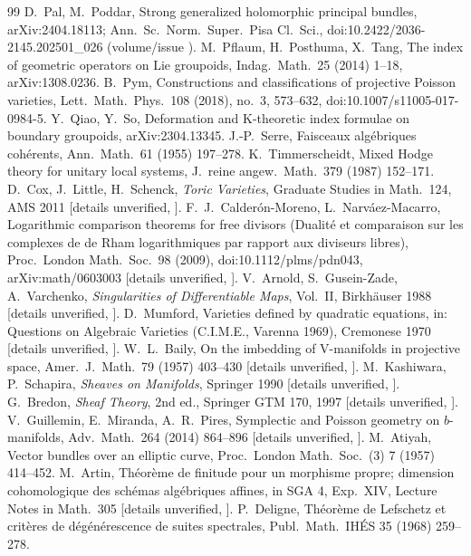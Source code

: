 \begin{thebibliography}{99}
 D.\ Pal, M.\ Poddar, Strong generalized holomorphic principal bundles, arXiv:2404.18113; Ann.\ Sc.\ Norm.\ Super.\ Pisa Cl.\ Sci., doi:10.2422/2036-2145.202501\_026 (volume/issue \tQ).
 M.\ Pflaum, H.\ Posthuma, X.\ Tang, The index of geometric operators on Lie groupoids, Indag.\ Math.\ 25 (2014) 1--18, arXiv:1308.0236.
 B.\ Pym, Constructions and classifications of projective Poisson varieties, Lett.\ Math.\ Phys.\ 108 (2018), no.\ 3, 573--632, doi:10.1007/s11005-017-0984-5.
 Y.\ Qiao, Y.\ So, Deformation and K-theoretic index formulae on boundary groupoids, arXiv:2304.13345.
 J.-P.\ Serre, Faisceaux alg\'ebriques coh\'erents, Ann.\ Math.\ 61 (1955) 197--278.
 K.\ Timmerscheidt, Mixed Hodge theory for unitary local systems, J.\ reine angew.\ Math.\ 379 (1987) 152--171.
 D.\ Cox, J.\ Little, H.\ Schenck, \emph{Toric Varieties}, Graduate Studies in Math.\ 124, AMS 2011 [details unverified, \tQ].
 F.\ J.\ Calder\'on-Moreno, L.\ Narv\'aez-Macarro, Logarithmic comparison theorems for free divisors (Dualit\'e et comparaison sur les complexes de de Rham logarithmiques par rapport aux diviseurs libres), Proc.\ London Math.\ Soc.\ 98 (2009), doi:10.1112/plms/pdn043, arXiv:math/0603003 [details unverified, \tQ].
 V.\ Arnold, S.\ Gusein-Zade, A.\ Varchenko, \emph{Singularities of Differentiable Maps}, Vol.\ II, Birkh\"auser 1988 [details unverified, \tQ].
 D.\ Mumford, Varieties defined by quadratic equations, in: Questions on Algebraic Varieties (C.I.M.E., Varenna 1969), Cremonese 1970 [details unverified, \tQ].
 W.\ L.\ Baily, On the imbedding of V-manifolds in projective space, Amer.\ J.\ Math.\ 79 (1957) 403--430 [details unverified, \tQ].
 M.\ Kashiwara, P.\ Schapira, \emph{Sheaves on Manifolds}, Springer 1990 [details unverified, \tQ].
 G.\ Bredon, \emph{Sheaf Theory}, 2nd ed., Springer GTM 170, 1997 [details unverified, \tQ].
 V.\ Guillemin, E.\ Miranda, A.\ R.\ Pires, Symplectic and Poisson geometry on $b$-manifolds, Adv.\ Math.\ 264 (2014) 864--896 [details unverified, \tQ].
 M.\ Atiyah, Vector bundles over an elliptic curve, Proc.\ London Math.\ Soc.\ (3) 7 (1957) 414--452.
 M.\ Artin, Th\'eor\`eme de finitude pour un morphisme propre; dimension cohomologique des sch\'emas alg\'ebriques affines, in SGA 4, Exp.\ XIV, Lecture Notes in Math.\ 305 [details unverified, \tQ].
 P.\ Deligne, Th\'eor\`eme de Lefschetz et crit\`eres de d\'eg\'en\'erescence de suites spectrales, Publ.\ Math.\ IH\'ES 35 (1968) 259--278.
\end{thebibliography}
